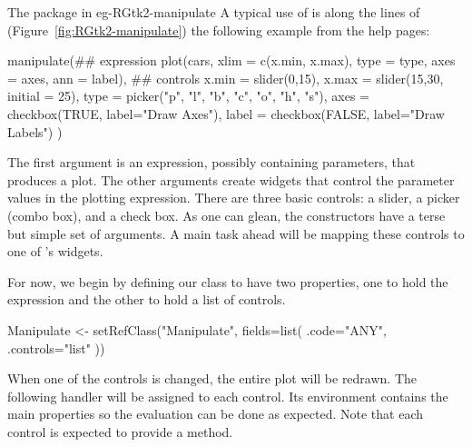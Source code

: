 \begin{example}{The  package in }{eg-RGtk2-manipulate}
A typical use of  is along the lines of
(Figure~\ref{fig:RGtk2-manipulate}) the following example from the
 help pages:
\begin{Schunk}
\begin{Sinput}
 manipulate(## expression
            plot(cars, xlim = c(x.min, x.max), type = type, 
                 axes = axes, ann = label),
            ## controls
            x.min = slider(0,15),
            x.max = slider(15,30, initial = 25),
            type = picker("p", "l", "b", "c", "o", "h", "s"),
            axes = checkbox(TRUE, label="Draw Axes"),
            label = checkbox(FALSE, label="Draw Labels")
            )
\end{Sinput}
\end{Schunk}
%
The first argument is an expression, possibly containing parameters,
that produces a plot. The other arguments create widgets that
control the parameter values in the plotting expression. There are
three basic controls: a slider, a picker (combo box), and a check
box. As one can glean, the constructors have a terse but simple set
of arguments. A main task ahead will be mapping these controls to one
of \GTK's widgets.

For now, we begin by defining our  class to have two
properties, one to hold the expression and the other to hold a list of controls.
\begin{Schunk}
\begin{Sinput}
 Manipulate <- setRefClass("Manipulate",
                           fields=list(
                             .code="ANY",
                             .controls="list"
                             ))
\end{Sinput}
\end{Schunk}
%



When one of the controls is changed, the entire plot will be
redrawn. The following handler will be assigned to each control. Its
environment contains the main properties so the evaluation can be done
as expected. Note that each control is expected to provide a
 method.

\begin{Schunk}
\end{Schunk}
%


\end{example}
